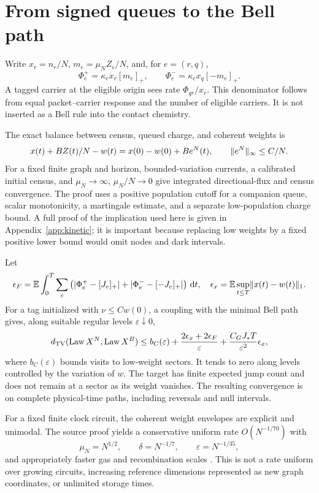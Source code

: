 \section{From signed queues to the Bell path}\label{section:pilot:from-signed-queues-to-the-bell-path}
Write $x_r=n_r/N$, $m_e=\mu_NZ_e/N$, and, for $e=(r,q)$,
\[
\Phi_e^+=\kappa_ex_r[m_e]_+,\qquad
\Phi_e^-=\kappa_ex_q[-m_e]_+.
\]
A tagged carrier at the eligible origin sees rate $\Phi_{qr}/x_r$. This denominator follows from equal packet--carrier response and the number of eligible carriers. It is not inserted as a Bell rule into the contact chemistry.

The exact balance between census, queued charge, and coherent weights is
\begin{equation}\label{eq:queuebalance}
x(t)+BZ(t)/N-w(t)
=x(0)-w(0)+Be^N(t),
\qquad \lVert e^N\rVert_\infty\le C/N.
\end{equation}
For a fixed finite graph and horizon, bounded-variation currents, a calibrated initial census, and
$\mu_N\to\infty$, $\mu_N/N\to0$ give integrated directional-flux and census convergence. The proof uses a positive population cutoff for a companion queue, scalar monotonicity, a martingale estimate, and a separate low-population charge bound. A full proof of the implication used here is given in Appendix~\ref{app:kinetic}; it is important because replacing low weights by a fixed positive lower bound would omit nodes and dark intervals.

Let
\[
\epsilon_F=\mathbb E\int_0^T\sum_e\left(
|\Phi_e^+-[J_e]_+|+|\Phi_e^--[-J_e]_+|\right)\,\mathrm d t,
\quad
\epsilon_x=\mathbb E\sup_{t\le T}\lVert x(t)-w(t)\rVert_1.
\]
For a tag initialized with $\nu\le Cw(0)$, a coupling with the minimal Bell path gives, along suitable regular levels $\varepsilon\downarrow0$,
\begin{equation}\label{eq:tagbound}
d_{\mathrm{TV}}(\operatorname{Law} X^N,\operatorname{Law} X^B)
\le b_C(\varepsilon)+\frac{2\epsilon_x+2\epsilon_F}{\varepsilon}
+\frac{C_GJ_*T}{\varepsilon^2}\epsilon_x,
\end{equation}
where $b_C(\varepsilon)$ bounds visits to low-weight sectors. It tends to zero along levels controlled by the variation of $w$. The target has finite expected jump count and does not remain at a sector as its weight vanishes. The resulting convergence is on complete physical-time paths, including reversals and null intervals.

For a fixed finite clock circuit, the coherent weight envelopes are explicit and unimodal. The source proof yields a conservative uniform rate $O(N^{-1/70})$ with
\[
\mu_N=N^{1/2},\qquad\delta=N^{-1/7},\qquad\varepsilon=N^{-1/35},
\]
and appropriately faster gas and recombination scales \cite{RodgersPilot}. This is not a rate uniform over growing circuits, increasing reference dimensions represented as new graph coordinates, or unlimited storage times.

